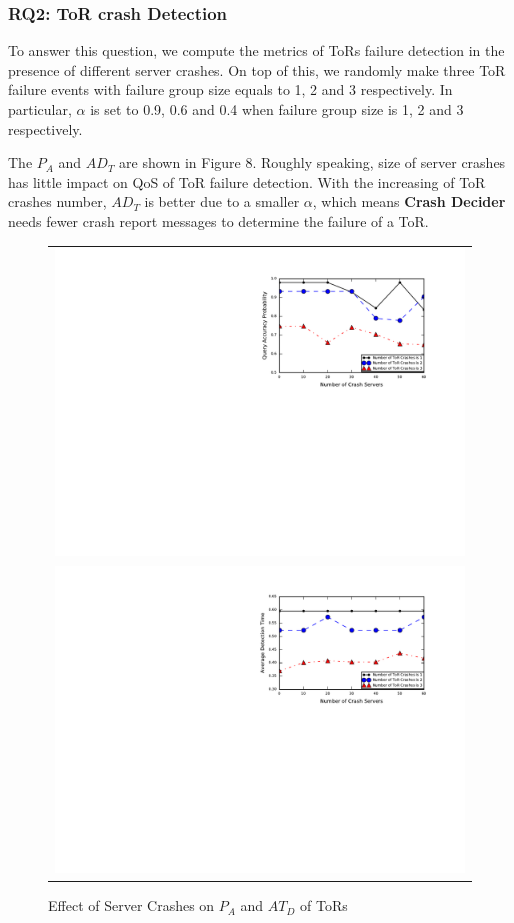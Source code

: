 \documentclass{sig-alternate-05-2015}
\begin{document}
\subsubsection*{RQ2: ToR crash Detection}
\quad To answer this question, we compute the metrics of ToRs failure detection in the presence of different server crashes. On top of this, we randomly make three ToR failure events with failure group size equals to 1, 2 and 3 respectively. In particular, $\alpha$ is set to 0.9, 0.6 and 0.4 when failure group size is 1, 2 and 3 respectively.

The $P_A$ and $AD_T$ are shown in Figure 8. Roughly speaking, size of server crashes has little impact on QoS of ToR failure detection. With the increasing of ToR crashes number, $AD_T$ is better due to a smaller $\alpha$, which means \textbf{Crash Decider} needs fewer crash report messages to determine the failure of a ToR.  

\begin{figure}[t]
  \centering
  \begin{tabular}{c}
  \includegraphics[scale=0.7]{tor-r1} \\
  \includegraphics[scale=0.7]{tor-r2} \\
  \end{tabular}
  \caption{Effect of Server Crashes on $P_A$ and $AT_D$ of ToRs}
\end{figure}
\end{document}
